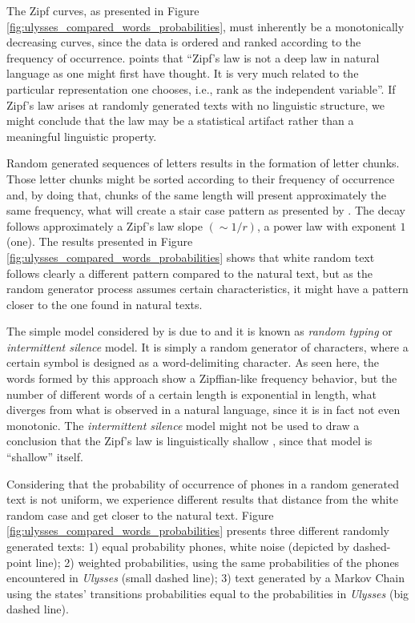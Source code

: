 The Zipf curves, as presented in Figure \ref{fig:ulysses_compared_words_probabilities}, 
must inherently be a monotonically decreasing curves, since the data is ordered and ranked
according to the frequency of occurrence. \cite{li1992} points that 
``Zipf's law is not a deep law in natural language as
one might first have thought. It is very much related to the particular representation one
chooses, i.e., rank as the independent variable''. 
If Zipf's law arises at randomly generated texts with no linguistic structure, we might conclude
that the law may be a statistical artifact rather than a meaningful linguistic property.

Random generated sequences of letters results in the formation of letter chunks. Those letter chunks
might be sorted according to their frequency of occurrence and, by doing that, chunks of the same
length will present approximately the same frequency, what will create a stair case pattern as presented 
by \citet{li1992}. The decay follows approximately a Zipf's law slope
$(\sim 1/r)$, a power law with exponent $1$ (one). 
The results presented in Figure \ref{fig:ulysses_compared_words_probabilities} shows that
white random text follows clearly a different pattern compared to the natural text,
but as the random generator process assumes certain characteristics, it might have a pattern
closer to the one found in natural texts.

The simple model considered by \citet{li1992} is due to \cite{miller1957,mandelbrot1965}
and it is known as \textit{random typing} or \textit{intermittent silence} model.
It is simply a random generator of characters, where a certain symbol is designed as 
a word-delimiting character. As seen here, the words formed by this approach
show a Zipffian-like frequency behavior, but the number of different words of a certain
length is exponential in length, what diverges from what is observed in a natural language,
since it is in fact not even monotonic.
The \textit{intermittent silence} model might not be used to draw a conclusion that
the Zipf's law is linguistically shallow \citep{mandelbrot1982}, since that model is ``shallow'' itself.


Considering that the probability of occurrence of phones in a random generated text is not uniform,
we experience different results that distance from the white random case and get closer to the natural text.
Figure \ref{fig:ulysses_compared_words_probabilities} presents three different randomly generated texts:
1) equal probability phones, white noise (depicted by dashed-point line); 2) weighted probabilities, using 
the same probabilities of the phones encountered in \textit{Ulysses} (small dashed line); 3) text generated
by a Markov Chain using the states' transitions probabilities equal to the probabilities in \textit{Ulysses} 
(big dashed line).


